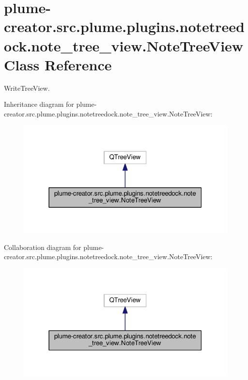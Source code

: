 \hypertarget{classplume-creator_1_1src_1_1plume_1_1plugins_1_1notetreedock_1_1note__tree__view_1_1_note_tree_view}{}\section{plume-\/creator.src.\+plume.\+plugins.\+notetreedock.\+note\+\_\+tree\+\_\+view.\+Note\+Tree\+View Class Reference}
\label{classplume-creator_1_1src_1_1plume_1_1plugins_1_1notetreedock_1_1note__tree__view_1_1_note_tree_view}


Write\+Tree\+View.  




Inheritance diagram for plume-\/creator.src.\+plume.\+plugins.\+notetreedock.\+note\+\_\+tree\+\_\+view.\+Note\+Tree\+View\+:\nopagebreak
\begin{figure}[H]
\begin{center}
\leavevmode
\includegraphics[width=316pt]{classplume-creator_1_1src_1_1plume_1_1plugins_1_1notetreedock_1_1note__tree__view_1_1_note_tree_view__inherit__graph}
\end{center}
\end{figure}


Collaboration diagram for plume-\/creator.src.\+plume.\+plugins.\+notetreedock.\+note\+\_\+tree\+\_\+view.\+Note\+Tree\+View\+:\nopagebreak
\begin{figure}[H]
\begin{center}
\leavevmode
\includegraphics[width=316pt]{classplume-creator_1_1src_1_1plume_1_1plugins_1_1notetreedock_1_1note__tree__view_1_1_note_tree_view__coll__graph}
\end{center}
\end{figure}
